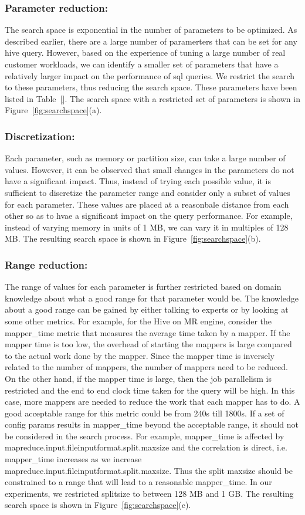 \noindent\subsubsection*{\bf Parameter reduction: }
The search space is exponential in the number of parameters to be optimized. As described earlier, there are a large number of paramerters that can be set for any hive query. However, based on the experience of tuning a large number of real customer workloads, we can identify a smaller set of parameters that have a relatively larger impact on the performance of sql queries. We restrict the search to these parameters, thus reducing the search space. These parameters have been listed in Table~\ref{}. The search space with a restricted set of parameters is shown in Figure~\ref{fig:searchspace}(a).
\noindent\subsubsection*{\bf Discretization: }
Each parameter, such as memory or partition size, can take a large number of values. However, it can be observed that small changes in the parameters do not have a significant impact. Thus, instead of trying each possible value, it is sufficient to discretize the parameter range and consider only a subset of values for each parameter. These values are placed at a reasonbale distance from each other so as to hvae a significant impact on the query performance. For example, instead of varying memory in units of 1 MB, we can vary it in multiples of 128 MB. The resulting search space is shown in Figure~\ref{fig:searchspace}(b).
\noindent\subsubsection*{\bf Range reduction: }
The range of values for each parameter is further restricted based on domain knowledge about what a good range for that parameter would be.  The knowledge about a good range can be gained by either talking to experts or by looking at some other metrics. For example, for the Hive on MR engine, consider the mapper\_time metric that measures the average time taken by a mapper. If the mapper time is too low, the overhead of starting the mappers is large compared to the actual work done by the mapper. Since the mapper time is inversely related to the number of mappers, the number of mappers need to be reduced. On the other hand, if the mapper time is large, then the job parallelism is restricted and the end to end clock time taken for the query will be high. In this case, more mappers are needed to reduce the work that each mapper has to do. A good acceptable range for this metric could be from 240s till 1800s.  If a set of config params results in mapper\_time beyond the acceptable range, it should not be considered in the search process. For example, mapper\_time is affected by mapreduce.input.fileinputformat.split.maxsize and the correlation is direct, i.e. mapper\_time  increases as we increase mapreduce.input.fileinputformat.split.maxsize.  Thus the split maxsize should be constrained to a range that will lead to a reasonable mapper\_time. In our experiments, we restricted splitsize to between 128 MB and 1 GB. The resulting search space is shown in Figure~\ref{fig:searchspace}(c).
